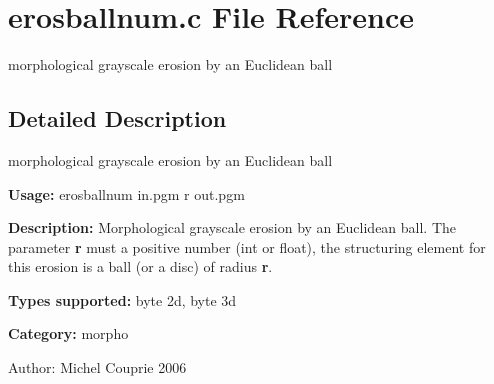 \section{erosballnum.c File Reference}
\label{erosballnum_8c}
morphological grayscale erosion by an Euclidean ball  




\label{_details}
\subsection{Detailed Description}
morphological grayscale erosion by an Euclidean ball 

{\bf Usage:} erosballnum in.pgm r out.pgm

{\bf Description:} Morphological grayscale erosion by an Euclidean ball. The parameter {\bf r} must a positive number (int or float), the structuring element for this erosion is a ball (or a disc) of radius {\bf r}.

{\bf Types supported:} byte 2d, byte 3d

{\bf Category:} morpho

\begin{Desc}
\item[Author:]Michel Couprie 2006 \end{Desc}
